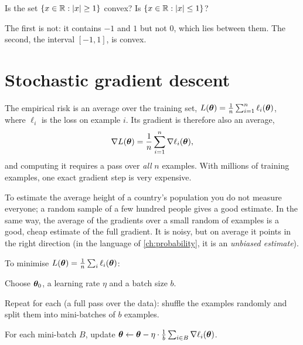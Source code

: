 \begin{exercise}
Is the set $\{x \in \mathbb{R} : \lvert x\rvert \ge 1\}$ convex? Is $\{x \in \mathbb{R} : \lvert x\rvert \le
1\}$?
\end{exercise}
\begin{solution}
The first is not: it contains $-1$ and $1$ but not $0$, which lies between them.
The second, the interval $[-1, 1]$, is convex.
\end{solution}

\section{Stochastic gradient descent}\label{sec:sgd}

The empirical risk is an average over the training set,
$L(\bm{\theta}) = \frac1n\sum_{i=1}^n\ell_i(\bm{\theta})$, where $\ell_i$ is the loss on
example $i$. Its gradient is therefore also an average,
\[
  \nabla L(\bm{\theta}) = \frac1n\sum_{i=1}^n\nabla\ell_i(\bm{\theta}),
\]
and computing it requires a pass over \emph{all} $n$ examples. With millions of
training examples, one exact gradient step is very expensive.

\begin{intuition}
To estimate the average height of a country's population you do not measure
everyone; a random sample of a few hundred people gives a good estimate. In the
same way, the average of the gradients over a small random
 of examples is a good, cheap estimate of the full gradient.
It is noisy, but on average it points in the right direction (in the language
of \cref{ch:probability}, it is an \emph{unbiased estimate}).
\end{intuition}

\begin{algorithm}\label{alg:sgd}
To minimise $L(\bm{\theta}) = \frac1n\sum_i\ell_i(\bm{\theta})$:
\begin{steps}
  \item Choose $\bm{\theta}_0$, a learning rate $\eta$ and a batch size $b$.
  \item Repeat for each  (a full pass over the data): shuffle the
    examples randomly and split them into mini-batches of $b$ examples.
  \item For each mini-batch $B$, update
    $\bm{\theta} \leftarrow \bm{\theta} - \eta\cdot\frac1b\sum_{i\in B}\nabla\ell_i(\bm{\theta})$.
\end{steps}
\end{algorithm}

